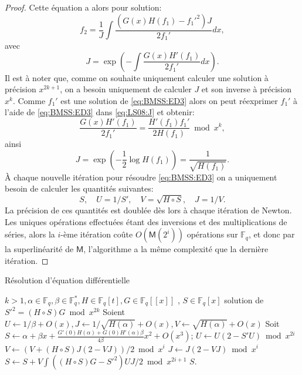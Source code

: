 \documentclass[10pt,a4paper]{book}
\theoremstyle{plain}
\theoremstyle{definition}
\theoremstyle{definition}
\theoremstyle{definition}
\theoremstyle{definition}
\theoremstyle{remark}
\theoremstyle{remark}
\theoremstyle{definition}
\begin{document}
\begin{proof}
 Cette équation a alors pour solution:
\begin{equation}
f_2=\frac{1}{J}\int \frac{(G(x)H(f_1)-f_1'^2)J}{2f_1'} dx,
\end{equation}
avec 
\begin{equation}
\label{eq:LS08:J}
J=\exp \left( -\int \frac{G(x)H'(f_1)}{2f_1'}dx \right).
\end{equation}
Il est à noter que, comme on souhaite uniquement calculer une solution à précision $x^{2k+1}$, on a besoin uniquement de calculer $J$ et son inverse à précision $x^k$.
Comme $f_1'$ est une solution de \eqref{eq:BMSS:ED3} alors on peut réexprimer $f_1'$ à l'aide de \eqref{eq:BMSS:ED3} dans \eqref{eq:LS08:J} et obtenir:
\begin{equation}
\frac{G(x)H'(f_1)}{2f_1'}=\frac{H'(f_1)f_1'}{2H(f_1)} \bmod x^k,
\end{equation}
ainsi 
\begin{equation}
J=\exp \left(-\frac{1}{2}\log H(f_1) \right)= \frac{1}{\sqrt{H(f_1)}}.
\end{equation}
\`A chaque nouvelle itération pour résoudre \eqref{eq:BMSS:ED3} on a uniquement besoin de calculer les quantités suivantes:
\begin{equation}
S, \quad U=1/S', \quad V=\sqrt{H \circ S}, \quad J=1/V.
\end{equation}
La précision de ces quantités est doublée dès lors à chaque itération de 
Newton. Les uniques opérations effectuées étant des inversions et des 
multiplications de séries, alors la $i$-ème itération coûte 
$O(\mathsf{M}(2^i))$ opérations sur $\mathbb{F}_q$, et donc par la superlinéarité
de $\mathsf{M}$, l'algorithme a la même complexité que la dernière itération. 
\end{proof}


\begin{algorithm}
\caption{\label{alg:BMSS:eqdiff} Résolution d'équation différentielle}
\begin{algorithmic}[1]
\REQUIRE $k>1, \alpha \in \mathbb{F}_q, \beta \in \mathbb{F}_q^*, H \in \mathbb{F}_q[t], G \in \mathbb{F}_{q}[[x]]$ ,%
\ENSURE $S \in \mathbb{F}_q[x]$ solution de $S'^2=(H \circ S)G \bmod x^{2k}$
\STATE Soient $U \gets 1/\beta + O(x), J \gets 1/\sqrt{H(\alpha)}+O(x), V \gets \sqrt{H(\alpha)} + O(x)$
\STATE Soit $S \gets \alpha + \beta x + \frac{G'(0)H(\alpha)+G(0)H'(\alpha)\beta}{4\beta}x^2+O(x^3)$;
\STATE $U \gets U(2-S'U) \bmod x^{2i}$
\STATE $V \gets (V+(H \circ S)J(2-VJ))/2 \bmod x^{i}$
\STATE $J \gets J(2-VJ) \bmod {x^i}$
\STATE \label{alg:BMSS:eqdiff:int} $S \gets S+V \int ((H \circ S)G-S'^2)UJ/2 \bmod x^{2i+1}$
\ENDFOR
\RETURN$S$. 
\end{algorithmic}
\end{algorithm}
\end{document}
